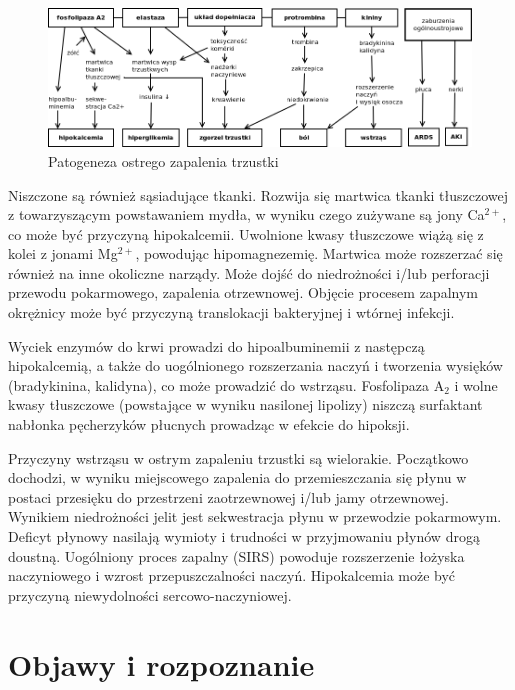 \documentclass[a4paper, 12pt]{report}
\begin{document}
\begin{figure}[h]
\centering
\includegraphics[scale=0.4]{pat_pan}
\caption{Patogeneza ostrego zapalenia trzustki}
\end{figure}

Niszczone są również sąsiadujące tkanki. Rozwija się martwica tkanki
tłuszczowej z towarzyszącym powstawaniem mydła, w wyniku czego
zużywane są jony Ca$^{2+}$, co może być przyczyną
hipokalcemii. Uwolnione kwasy tłuszczowe wiążą się z kolei z jonami
Mg$^{2+}$, powodując hipomagnezemię. Martwica może rozszerzać się
również na inne okoliczne narządy. Może dojść do niedrożności i/lub
perforacji przewodu pokarmowego, zapalenia otrzewnowej. Objęcie
procesem zapalnym okrężnicy może być przyczyną translokacji
bakteryjnej i wtórnej infekcji.

Wyciek enzymów do krwi prowadzi do hipoalbuminemii z następczą
hipokalcemią, a także do uogólnionego rozszerzania naczyń i tworzenia
wysięków (bradykinina, kalidyna), co może prowadzić do
wstrząsu. Fosfolipaza A$_2$ i wolne kwasy tłuszczowe (powstające w
wyniku nasilonej lipolizy) niszczą surfaktant nabłonka pęcherzyków
płucnych prowadząc w efekcie do hipoksji.

Przyczyny wstrząsu w ostrym zapaleniu trzustki są
wielorakie. Początkowo dochodzi, w wyniku miejscowego zapalenia do
przemieszczania się płynu w postaci przesięku do
przestrzeni zaotrzewnowej i/lub jamy otrzewnowej. Wynikiem
niedrożności jelit jest sekwestracja płynu w przewodzie
pokarmowym. Deficyt płynowy nasilają wymioty i trudności w przyjmowaniu
płynów drogą doustną. Uogólniony proces zapalny (SIRS) powoduje
rozszerzenie łożyska naczyniowego i wzrost przepuszczalności naczyń.
Hipokalcemia może być przyczyną niewydolności sercowo-naczyniowej.

\chapter{Objawy i rozpoznanie}
\end{document}
